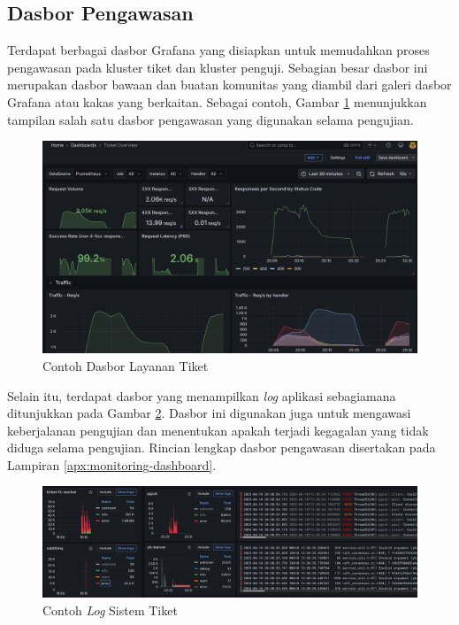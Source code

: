 \subsection{Dasbor Pengawasan}

Terdapat berbagai dasbor Grafana yang disiapkan untuk memudahkan proses pengawasan pada kluster tiket dan kluster penguji. Sebagian besar dasbor ini merupakan dasbor bawaan dan buatan komunitas yang diambil dari galeri dasbor Grafana atau kakas yang berkaitan. Sebagai contoh, Gambar \ref{fig:ticket-dashboard-example} menunjukkan tampilan salah satu dasbor pengawasan yang digunakan selama pengujian.

\begin{figure}[htbp]
    \centering
    \includegraphics[width=1\textwidth]{resources/chapter-4/ticket-dashboard.png}
    \caption{Contoh Dasbor Layanan Tiket}
    \label{fig:ticket-dashboard-example}
\end{figure}

Selain itu, terdapat dasbor yang menampilkan \textit{log} aplikasi sebagiamana ditunjukkan pada Gambar \ref{fig:log-example}. Dasbor ini digunakan juga untuk mengawasi keberjalanan pengujian dan menentukan apakah terjadi kegagalan yang tidak diduga selama pengujian. Rincian lengkap dasbor pengawasan disertakan pada Lampiran \ref{apx:monitoring-dashboard}.

\begin{figure}[htbp]
    \centering
    \includegraphics[width=1\textwidth]{resources/chapter-4/log.png}
    \caption{Contoh \textit{Log} Sistem Tiket}
    \label{fig:log-example}
\end{figure}
